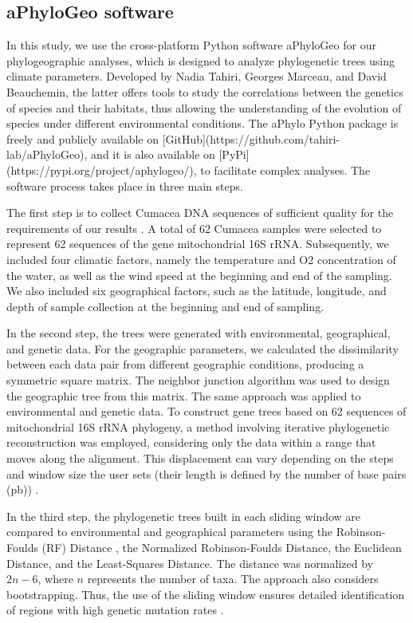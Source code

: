 \subsection{aPhyloGeo software}

In this study, we use the cross-platform Python software aPhyloGeo for our phylogeographic analyses, which is designed to analyze phylogenetic trees using climate parameters. Developed by Nadia Tahiri, Georges Marceau, and David Beauchemin, the latter offers tools to study the correlations between the genetics of species and their habitats, thus allowing the understanding of the evolution of species under different environmental conditions. The aPhylo Python package is freely and publicly available on [GitHub](https://github.com/tahiri-lab/aPhyloGeo), and it is also available on [PyPi](https://pypi.org/project/aphylogeo/), to facilitate complex analyses. The software process takes place in three main steps. 

    The first step is to collect Cumacea DNA sequences of sufficient quality for the requirements of our results \citep{koshkarov_phylogeography_2022}. A total of 62 Cumacea samples were selected to represent 62 sequences of the gene mitochondrial 16S rRNA. Subsequently, we included four climatic factors, namely the temperature and O2 concentration of the water, as well as the wind speed at the beginning and end of the sampling. We also included six geographical factors, such as the latitude, longitude, and depth of sample collection at the beginning and end of sampling.

    In the second step, the trees were generated with environmental, geographical, and genetic data. For the geographic parameters, we calculated the dissimilarity between each data pair from different geographic conditions, producing a symmetric square matrix. The neighbor junction algorithm was used to design the geographic tree from this matrix. The same approach was applied to environmental and genetic data. To construct gene trees based on 62 sequences of mitochondrial 16S rRNA phylogeny, a method involving iterative phylogenetic reconstruction was employed, considering only the data within a range that moves along the alignment. This displacement can vary depending on the steps and window size the user sets (their length is defined by the number of base pairs (pb)) \citep{koshkarov_phylogeography_2022}.

    In the third step, the phylogenetic trees built in each sliding window are compared to environmental and geographical parameters using the Robinson-Foulds (RF) Distance \citep{robinson_comparison_1981,koshkarov_phylogeography_2022}, the Normalized Robinson-Foulds Distance, the Euclidean Distance, and the Least-Squares Distance. The distance was normalized by $2n-6$, where $n$ represents the number of taxa. The approach also considers bootstrapping. Thus, the use of the sliding window ensures detailed identification of regions with high genetic mutation rates \citep{koshkarov_phylogeography_2022}.

